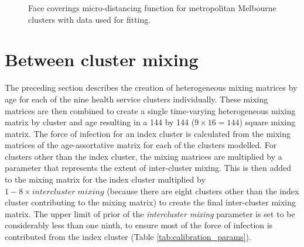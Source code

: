 \begin{figure}[ht]
    \caption{Face coverings micro-distancing function for metropolitan Melbourne clusters with data used for fitting.}
	\label{fig:face}
\end{figure}

\section{Between cluster mixing}
The preceding section describes the creation of heterogeneous mixing matrices by age for each of the nine health service clusters individually. These mixing matrices are then combined to create a single time-varying heterogeneous mixing matrix by cluster and age resulting in a 144 by 144 (\(9\times16=144\)) square mixing matrix. The force of infection for an index cluster is calculated from the mixing matrices of the age-assortative matrix for each of the clusters modelled. For clusters other than the index cluster, the mixing matrices are multiplied by a parameter that represents the extent of inter-cluster mixing. This is then added to the mixing matrix for the index cluster multiplied by \(1-8\times intercluster\;mixing\) (because there are eight clusters other than the index cluster contributing to the mixing matrix) to create the final inter-cluster mixing matrix. The upper limit of prior of the \textit{intercluster mixing} parameter is set to be considerably less than one ninth, to ensure most of the force of infection is contributed from the index cluster (Table \ref{tab:calibration_params}).
